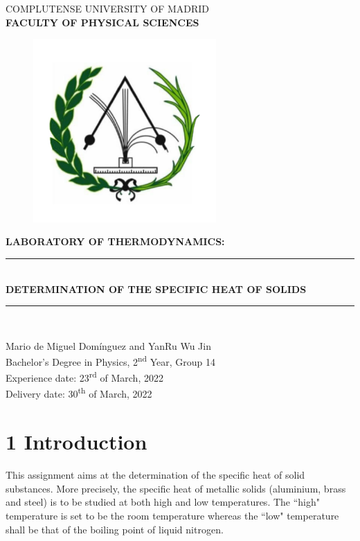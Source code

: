 \documentclass[a4paper, 12pt]{article}
\newcommand\blankpage{%
	\null
	\thispagestyle{empty}%
	\addtocounter{page}{-1}%
	\newpage}
\begin{document}
	\begin{titlepage}
		\centering
		\vfill
		\Large{COMPLUTENSE UNIVERSITY OF MADRID \\ \textbf{FACULTY OF PHYSICAL SCIENCES}}
		\vfill
		\begin{figure}[h!]
			\centering
			\includegraphics[height=7cm]{cumphysics}
		\end{figure}
		\vfill 
		\textbf{\Large{LABORATORY OF THERMODYNAMICS:}}
		\rule [5pt]{14cm}{2pt}\\
		\LARGE{\textbf{DETERMINATION OF THE SPECIFIC HEAT OF SOLIDS}} \\
		\rule [8pt]{14cm}{2pt}\\
		\vfill
		\vfill
		\vfill
		\vfill
		
		\large{Mario de Miguel Domínguez and YanRu Wu Jin\\ Bachelor's Degree in Physics, 2\textsuperscript{nd} Year, Group 14\\ Experience date: 23\textsuperscript{rd} of March, 2022\\ Delivery date: 30\textsuperscript{th} of March, 2022}
		\vfill
		\vfill
		\vfill
		\vfill
		
		\afterpage{\blankpage}
	\end{titlepage}
	
	\makeatletter
	\thispagestyle{empty}
	\addtocounter{page}{-1}
	\let\latexl@section\l@section
	\def\l@section#1#2{\begingroup\let\numberline\@gobble\latexl@section{#1}{#2}\endgroup}
	\let\latexl@subsection\l@subsection
	\def\l@subsection#1#2{\begingroup\let\numberline\@gobble\latexl@subsection{#1}{#2}\endgroup}
	\let\latexl@subsubsection\l@subsubsection
	\def\l@subsubsection#1#2{\begingroup\let\numberline\@gobble\latexl@subsubsection{#1}{#2}\endgroup}
	\makeatother
	\tableofcontents	
	\thispagestyle{empty}
	\afterpage{\blankpage}
	\newpage
	\section{1 Introduction}
	This assignment aims at the determination of the specific heat of solid substances. More precisely, the specific heat of metallic solids (aluminium, brass and steel) is to be studied at both high and low temperatures.
	The ``high" temperature is set to be the room temperature whereas the ``low" temperature shall be that of the boiling point of liquid nitrogen. \\
	
\end{document}
